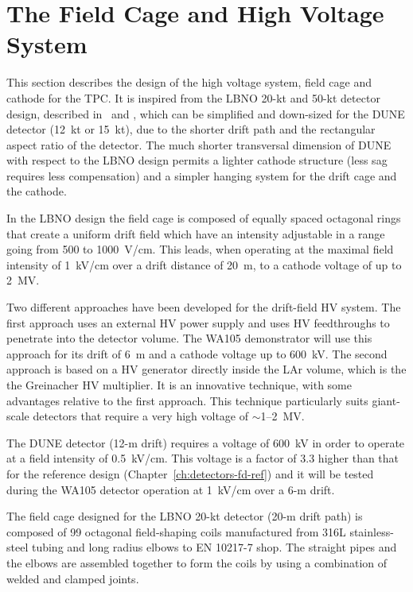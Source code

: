 \section{The Field Cage and High Voltage System} 
\label{sec:detectors-fd-alt-hv}

This section describes the design of the high voltage system, field
cage and cathode for the TPC.  It is inspired from the LBNO 20-kt and
50-kt detector design, described in \anxlbnoa\ and \anxlbnob, which can
be simplified and down-sized for the DUNE detector (12~kt or 15~kt),
due to the shorter drift path and the rectangular aspect ratio of the
detector. The much shorter transversal dimension of DUNE with respect
to the LBNO design permits a lighter cathode structure (less sag
requires less compensation) and a simpler hanging system for the drift
cage and the cathode.

In the LBNO design the field cage is composed of equally spaced
octagonal rings that create a uniform drift field which have an
intensity adjustable in a range going from 500 to 1000~V/cm. This
leads, when operating at the maximal field intensity of 1~kV/cm over a
drift distance of 20~m, to a cathode voltage of up to 2~MV.

Two different approaches have been developed for the drift-field HV
system. The first approach uses an external HV power supply and uses
HV feedthroughs to penetrate into the detector volume. The WA105
demonstrator will use this approach for its drift of 6~m and a cathode
voltage up to 600~kV.  The second approach is based on a HV generator
directly inside the LAr volume, which is the the Greinacher HV
multiplier. It is an innovative technique, with some advantages
relative to the first approach. This technique particularly suits
giant-scale detectors that require a very high voltage of
$\sim$1--2~MV.

The DUNE detector (12-m drift) requires a voltage of 600~kV in order
to operate at a field intensity of 0.5~kV/cm. This voltage is a factor
of 3.3 higher than that for the reference design
(Chapter~\ref{ch:detectors-fd-ref}) and it will be tested during the
WA105 detector operation at 1~kV/cm over a 6-m drift.

The field cage designed for the LBNO 20-kt detector (20-m drift path)
is composed of 99 octagonal field-shaping coils manufactured from 316L
stainless-steel tubing and long radius elbows to EN 10217-7 shop. The
straight pipes and the elbows are assembled together to form the coils
by using a combination of welded and clamped joints.

